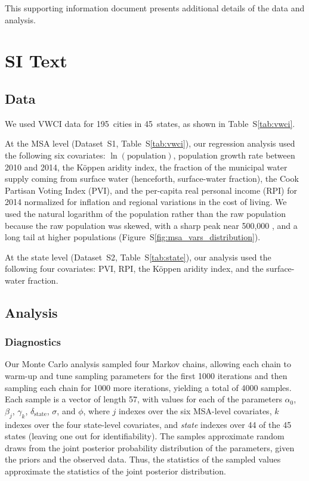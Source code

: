 \documentclass[draft]{agujournal}\usepackage{knitr}
\begin{document}
This supporting information document presents additional details of the data and analysis.

\section*{SI Text}

\subsection*{Data}
We used VWCI data for 195~cities in 45~states, as shown in Table~S\ref{tab:vwci}.

At the MSA level (Dataset~S1, Table~S\ref{tab:vwci}), our regression analysis used the following six covariates: $\ln(\text{population})$, population growth rate between 2010 and 2014, the K\"oppen aridity index, the fraction of the municipal water supply coming from surface water (henceforth, surface-water fraction), the Cook Partisan Voting Index (PVI), and the per-capita real personal income (RPI) for 2014 normalized for inflation and regional variations in the cost of living. We used the natural logarithm of the population rather than the raw population because the raw population was
skewed, with a sharp peak near 500,000%
, and a long tail at higher populations
(Figure~S\ref{fig:msa_vars_distribution}).

At the state level (Dataset~S2, Table~S\ref{tab:state}), our analysis used the following four covariates: PVI, RPI, the K\"oppen aridity index, and the surface-water fraction.



\subsection*{Analysis}

\subsubsection*{Diagnostics}

\iftrue
Our Monte Carlo analysis sampled four Markov chains,
allowing each chain to warm-up and tune sampling parameters for
the first 1000 iterations
and then sampling each chain for 1000 more iterations,
yielding a total of 4000 samples.
Each sample is a vector of length 57,
with values for each of the parameters
$\alpha_0$, $\beta_j$, $\gamma_k$, $\delta_{\text{state}}$, $\sigma$, and $\phi$,
where $j$ indexes over the six MSA-level covariates,
$k$ indexes over the four state-level covariates,
and \emph{state\/} indexes over
44 of the 45 states (leaving one out for
identifiability).
The samples approximate random draws from the joint posterior probability
distribution of the parameters, given the priors and the observed
data. Thus, the statistics of the sampled values approximate the statistics
of the joint posterior distribution.
\end{document}
